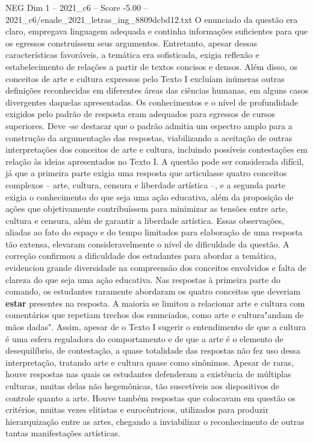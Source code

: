 \begin{textsample}{NEG Dim 1 – 2021\_c6 – Score -5.00 – 2021\_c6/enade\_2021\_letras\_ing\_8809dcbd12.txt}
O enunciado da questão era claro, empregava linguagem adequada e continha informações suficientes para que os egressos construíssem seus argumentos.
Entretanto, apesar dessas características favoráveis, a temática era sofisticada, exigia reflexão e estabelecimento de relações a partir de textos concisos e densos.
Além disso, os conceitos de arte e cultura expressos pelo Texto I excluíam inúmeras outras definições reconhecidas em diferentes áreas das ciências humanas, em alguns casos divergentes daquelas apresentadas.
Os conhecimentos e o nível de profundidade exigidos pelo padrão de resposta eram adequados para egressos de cursos superiores.
Deve -se destacar que o padrão admitia um espectro amplo para a construção da argumentação das respostas, viabilizando a aceitação de outras interpretações dos conceitos de arte e cultura, incluindo possíveis contestações em relação às ideias apresentados no Texto I.
A questão pode ser considerada difícil, já que a primeira parte exigia uma resposta que articulasse quatro conceitos complexos – arte, cultura, censura e liberdade artística –, e a segunda parte exigia o conhecimento do que seja uma ação educativa, além da proposição de ações que objetivamente contribuíssem para minimizar as tensões entre arte, cultura e censura, além de garantir a liberdade artística.
Essas observações, aliadas ao fato do espaço e do tempo limitados para elaboração de uma resposta tão extensa, elevaram consideravelmente o nível de dificuldade da questão.
A correção confirmou a dificuldade dos estudantes para abordar a temática, evidenciou grande diversidade na compreensão dos conceitos envolvidos e falta de clareza do que seja uma ação educativa.
Nas respostas à primeira parte do comando, os estudantes raramente abordaram os quatro conceitos que deveriam \textbf{estar} presentes na resposta.
A maioria se limitou a relacionar arte e cultura com comentários que repetiam trechos dos enunciados, como arte e cultura"andam de mãos dadas".
Assim, apesar de o Texto I sugerir o entendimento de que a cultura é uma esfera reguladora do comportamento e de que a arte é o elemento de desequilíbrio, de contestação, a quase totalidade das respostas não fez uso dessa interpretação, tratando arte e cultura quase como sinônimos.
Apesar de raras, houve respostas nas quais os estudantes defenderam a existência de múltiplas culturas, muitas delas não hegemônicas, tão suscetíveis aos dispositivos de controle quanto a arte.
Houve também respostas que colocavam em questão os critérios, muitas vezes elitistas e eurocêntricos, utilizados para produzir hierarquização entre as artes, chegando a inviabilizar o reconhecimento de outras tantas manifestações artísticas.

\end{textsample}
